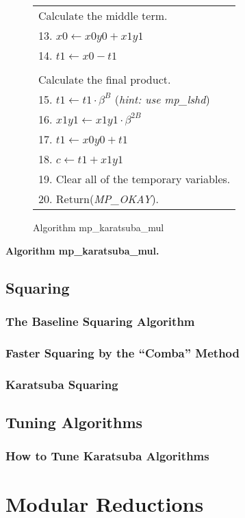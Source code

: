 \documentclass[b5paper]{book}
\begin{document}
\begin{figure}[!here]
\begin{small}
\begin{center}
\begin{tabular}{l}
\\
Calculate the middle term. \\
13.  $x0 \leftarrow x0y0 + x1y1$ \\
14.  $t1 \leftarrow x0 - t1$ \\
\\
Calculate the final product. \\
15.  $t1 \leftarrow t1 \cdot \beta^B$ (\textit{hint: use mp\_lshd}) \\
16.  $x1y1 \leftarrow x1y1 \cdot \beta^{2B}$ \\
17.  $t1 \leftarrow x0y0 + t1$ \\
18.  $c \leftarrow t1 + x1y1$ \\
19.  Clear all of the temporary variables. \\
20.  Return(\textit{MP\_OKAY}).\\
\hline 
\end{tabular}
\end{center}
\end{small}
\caption{Algorithm mp\_karatsuba\_mul}
\end{figure}

\textbf{Algorithm mp\_karatsuba\_mul.}


\section{Squaring}
\subsection{The Baseline Squaring Algorithm}
\subsection{Faster Squaring by the ``Comba'' Method}
\subsection{Karatsuba Squaring}
\section{Tuning Algorithms}
\subsection{How to Tune Karatsuba Algorithms}

\chapter{Modular Reductions}
\end{document}
